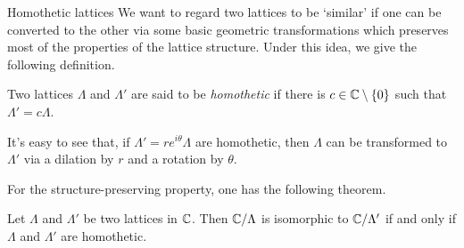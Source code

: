 \begin{hyperbolicbox}{Homothetic lattices}
    \small
    We want to regard two lattices to be `similar' if one can be converted to the other via some basic geometric transformations which preserves most of the properties of the lattice structure. Under this idea, we give the following definition.

    \begin{defi}
        Two lattices $\Lambda$ and $\Lambda'$ are said to be \textit{homothetic} if there is $c\in\mathbb{C}\setminus\left\{0\right\}$ such that $\Lambda'=c\Lambda$. \cite{milneMF}
    \end{defi}
    
    It's easy to see that, if $\Lambda'=re^{i\theta}\Lambda$ are homothetic, then $\Lambda$ can be transformed to $\Lambda'$ via a dilation by $r$ and a rotation by $\theta$.

    For the structure-preserving property, one has the following theorem.

    \begin{thm}
        Let $\Lambda$ and $\Lambda'$ be two lattices in $\mathbb{C}$. Then $\mathbb{C}/\Lambda$ is isomorphic to $\mathbb{C}/\Lambda'$ if and only if $\Lambda$ and $\Lambda'$ are homothetic. \cite{silvermanTA}
    \end{thm}
\end{hyperbolicbox}